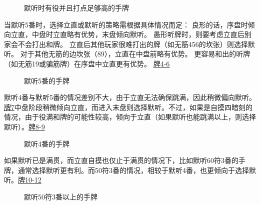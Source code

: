 \begin{figure}[h]
    \caption{默听时有役并且打点足够高的手牌}
    \label{lec2:pai1-3}
    \par\bigskip
    \par\bigskip
\end{figure}

当默听5番时，选择立直或默听的策略需根据具体情况而定：
良形的话，序盘时倾向立直，中盘时立直略有优势，末盘倾向默听。
愚形听牌时，则要考虑立直后别家会不会打出和牌。
立直后其他玩家很难打出的牌（如无筋456的坎张）则选择默听。
对于其他无筋的边坎张（89），立直在中盘前略有优势。
更容易和出的听牌（如无筋19或骗筋牌）在序盘中立直更有优势。
\hyperref[lec2:pai4-6]{牌4-6}

\begin{figure}[h]
    \caption{默听5番的手牌}
    \label{lec2:pai4-6}
    \par\bigskip
    \par\bigskip
\end{figure}


默听4番与默听5番的情况差别不大，由于立直无法确保跳满，因此稍微偏向默听。
\hyperref[lec2:pai7-9]{牌7}中盘阶段稍微倾向立直，而进入末盘则选择默听。不过，如果是自摸四暗刻的情况，由于役满和牌的可能性较高，倾向于立直（如果默听也能跳满以上，则选择默听）。\hyperref[lec2:pai7-9]{牌8-9}
\begin{figure}[h]
    \caption{默听4番的手牌}
    \label{lec2:pai7-9}
    \par\bigskip
    \par\bigskip
\end{figure}

如果默听已是满贯，而立直自摸也仅止于满贯的情况下，比如默听60符3番的手牌，通常选择默听更有利。而50符3番的情况，相较于默听4番，也更倾向于选择默听。\hyperref[lec2:pai10-12]{牌10-12}
\begin{figure}[h]
    \caption{默听50符3番以上的手牌}
    \label{lec2:pai10-12}
    \par\bigskip
    \par\bigskip
\end{figure}

